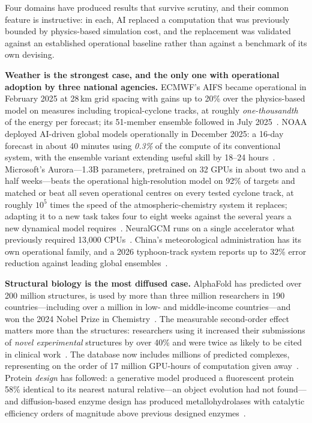 Four domains have produced results that survive scrutiny, and their common feature is instructive: in each, AI replaced a computation that was previously bounded by physics-based simulation cost, and the replacement was validated against an established operational baseline rather than against a benchmark of its own devising.

\textbf{Weather is the strongest case, and the only one with operational adoption by three national agencies.} ECMWF's AIFS became operational in February 2025 at 28\,km grid spacing with gains up to 20\% over the physics-based model on measures including tropical-cyclone tracks, at roughly \emph{one-thousandth} of the energy per forecast; its 51-member ensemble followed in July 2025~\cite{ecmwf-aifs}. NOAA deployed AI-driven global models operationally in December 2025: a 16-day forecast in about 40 minutes using \emph{0.3\%} of the compute of its conventional system, with the ensemble variant extending useful skill by 18--24 hours~\cite{noaa-ai}. Microsoft's Aurora---1.3B parameters, pretrained on 32 GPUs in about two and a half weeks---beats the operational high-resolution model on 92\% of targets and matched or beat all seven operational centres on every tested cyclone track, at roughly $10^5$ times the speed of the atmospheric-chemistry system it replaces; adapting it to a new task takes four to eight weeks against the several years a new dynamical model requires~\cite{aurora}. NeuralGCM runs on a single accelerator what previously required 13,000 CPUs~\cite{neuralgcm}. China's meteorological administration has its own operational family, and a 2026 typhoon-track system reports up to 32\% error reduction against leading global ensembles~\cite{cma-ai,fuxi-cnops}.

\textbf{Structural biology is the most diffused case.} AlphaFold has predicted over 200 million structures, is used by more than three million researchers in 190 countries---including over a million in low- and middle-income countries---and won the 2024 Nobel Prize in Chemistry~\cite{alphafold-impact,nobel-2024}. The measurable second-order effect matters more than the structures: researchers using it increased their submissions of \emph{novel experimental} structures by over 40\% and were twice as likely to be cited in clinical work~\cite{alphafold-impact}. The database now includes millions of predicted complexes, representing on the order of 17 million GPU-hours of computation given away~\cite{alphafold-db}. Protein \emph{design} has followed: a generative model produced a fluorescent protein 58\% identical to its nearest natural relative---an object evolution had not found---and diffusion-based enzyme design has produced metallohydrolases with catalytic efficiency orders of magnitude above previous designed enzymes~\cite{esm3,rfdiffusion3}.

